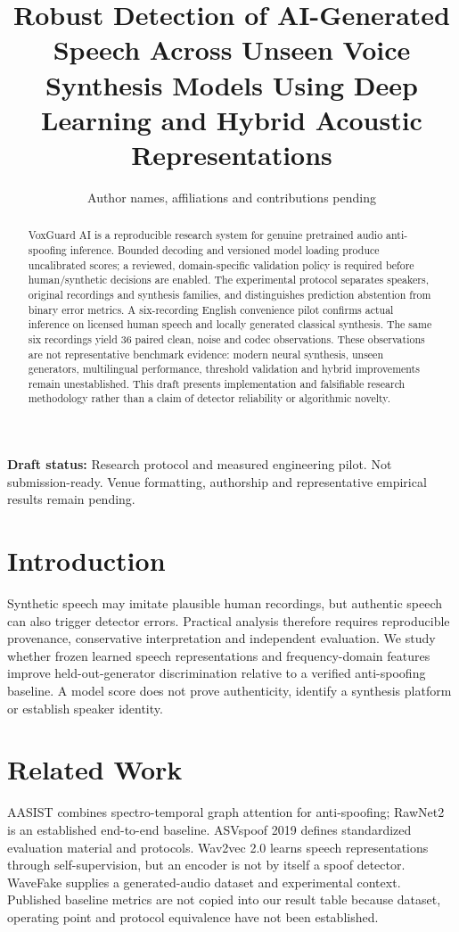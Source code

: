 \IfFileExists{IEEEtran.cls}{\documentclass[conference]{IEEEtran}}{\documentclass[10pt,twocolumn]{article}\usepackage[margin=0.75in]{geometry}}
\title{Robust Detection of AI-Generated Speech Across Unseen Voice Synthesis Models Using Deep Learning and Hybrid Acoustic Representations}
\author{Author names, affiliations and contributions pending}
\date{}
\begin{document}
\maketitle
\begin{abstract}
VoxGuard AI is a reproducible research system for genuine pretrained audio anti-spoofing inference. Bounded decoding and versioned model loading produce uncalibrated scores; a reviewed, domain-specific validation policy is required before human/synthetic decisions are enabled. The experimental protocol separates speakers, original recordings and synthesis families, and distinguishes prediction abstention from binary error metrics. A six-recording English convenience pilot confirms actual inference on licensed human speech and locally generated classical synthesis. The same six recordings yield 36 paired clean, noise and codec observations. These observations are not representative benchmark evidence: modern neural synthesis, unseen generators, multilingual performance, threshold validation and hybrid improvements remain unestablished. This draft presents implementation and falsifiable research methodology rather than a claim of detector reliability or algorithmic novelty.
\end{abstract}
\noindent\textbf{Draft status:} Research protocol and measured engineering pilot. Not submission-ready. Venue formatting, authorship and representative empirical results remain pending.

\section{Introduction}
Synthetic speech may imitate plausible human recordings, but authentic speech can also trigger detector errors. Practical analysis therefore requires reproducible provenance, conservative interpretation and independent evaluation. We study whether frozen learned speech representations and frequency-domain features improve held-out-generator discrimination relative to a verified anti-spoofing baseline. A model score does not prove authenticity, identify a synthesis platform or establish speaker identity.

\section{Related Work}
AASIST combines spectro-temporal graph attention for anti-spoofing\cite{jung2021aasist}; RawNet2 is an established end-to-end baseline\cite{tak2021rawnet2}. ASVspoof 2019 defines standardized evaluation material and protocols\cite{wang2020asvspoof}. Wav2vec 2.0 learns speech representations through self-supervision\cite{baevski2020wav2vec}, but an encoder is not by itself a spoof detector. WaveFake supplies a generated-audio dataset and experimental context\cite{frank2021wavefake}. Published baseline metrics are not copied into our result table because dataset, operating point and protocol equivalence have not been established.
\end{document}
